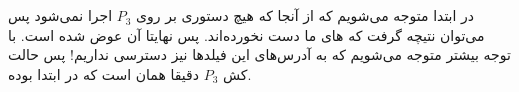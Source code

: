\section{}
در ابتدا متوجه می‌شویم که از آنجا که هیچ دستوری بر روی
$P_3$
اجرا نمی‌شود پس می‌توان نتیچه گرفت که
های
ما دست نخورده‌اند. پس نهایتا
آن عوض شده است. با توجه بیشتر متوجه می‌شویم که به آدرس‌های این فیلد‌ها نیز دسترسی نداریم! پس حالت کش
$P_3$
دقیقا همان است که در ابتدا بوده.

